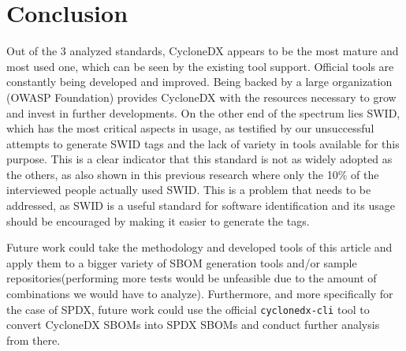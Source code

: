 \section{Conclusion}

Out of the 3 analyzed standards, CycloneDX appears to be the most mature and most used one, which can be seen by the existing tool support. Official tools are constantly being developed and improved. Being backed by a large organization (OWASP Foundation) provides CycloneDX with the resources necessary to grow and invest in further developments. On the other end of the spectrum lies SWID, which has the most critical aspects in usage, as testified by our unsuccessful attempts to generate SWID tags and the lack of variety in tools available for this purpose. This is a clear indicator that this standard is not as widely adopted as the others, as also shown in this previous research \cite{article:software-bom} where only the 10\% of the interviewed people actually used SWID.  This is a problem that needs to be addressed, as SWID is a useful standard for software identification and its usage should be encouraged by making it easier to generate the tags.

Future work could take the methodology and developed tools of this article and apply them to a bigger variety of SBOM generation tools and/or sample repositories(performing more tests would be unfeasible due to the amount of combinations we would have to analyze). Furthermore, and more specifically for the case of SPDX, future work could use the official \verb|cyclonedx-cli| tool to convert CycloneDX SBOMs into SPDX SBOMs and conduct further analysis from there.